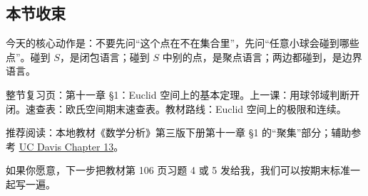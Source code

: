 \subsection*{本节收束}

今天的核心动作是：不要先问“这个点在不在集合里”，先问“任意小球会碰到哪些点”。碰到 \(S\)，是闭包语言；碰到 \(S\) 中别的点，是聚点语言；两边都碰到，是边界语言。

整节复习页：第十一章 §1：Euclid 空间上的基本定理。上一课：用球邻域判断开闭。速查表：欧氏空间期末速查表。教材路线：Euclid 空间上的极限和连续。

推荐阅读：本地教材《数学分析》第三版下册第十一章 §1 的“聚集”部分；辅助参考 \href{https://www.math.ucdavis.edu/~hunter/intro_analysis_pdf/ch13.pdf}{UC Davis Chapter 13}。

如果你愿意，下一步把教材第 106 页习题 4 或 5 发给我，我们可以按期末标准一起写一遍。
